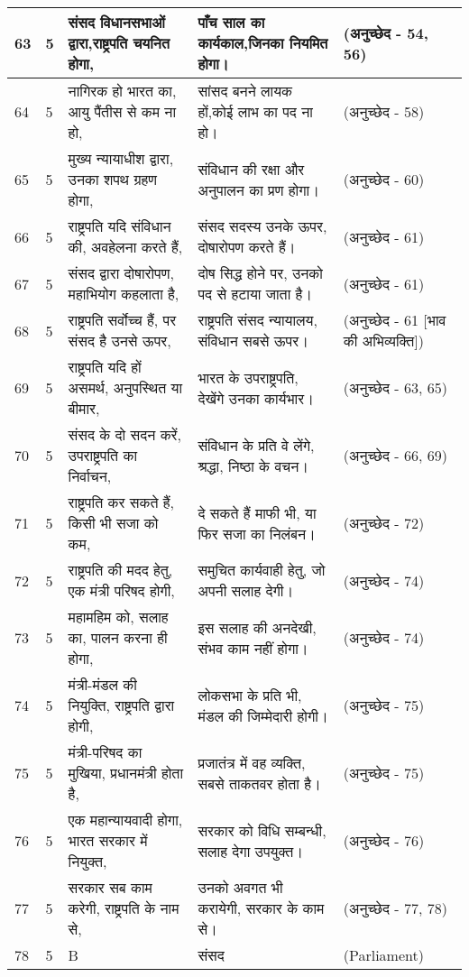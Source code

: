 \begin{longtable}{|l|l|l|l|l|}
63 & 5 & संसद विधानसभाओं द्वारा,राष्ट्रपति चयनित होगा, & पाँच साल का कार्यकाल,जिनका नियमित होगा। & (अनुच्छेद - 54, 56) \\ \hline 
64 & 5 & नागिरक हो भारत का, आयु पैंतीस से कम ना हो, & सांसद बनने लायक हों,कोई लाभ का पद ना हो। & (अनुच्छेद - 58) \\ \hline 
65 & 5 & मुख्य न्यायाधीश द्वारा, उनका शपथ ग्रहण होगा, & संविधान की रक्षा और अनुपालन का प्रण होगा। & (अनुच्छेद - 60) \\ \hline 
66 & 5 & राष्ट्रपति यदि संविधान की, अवहेलना करते हैं, & संसद सदस्य उनके ऊपर, दोषारोपण करते हैं। & (अनुच्छेद - 61) \\ \hline 
67 & 5 & संसद द्वारा दोषारोपण, महाभियोग कहलाता है, & दोष सिद्ध होने पर, उनको पद से हटाया जाता है। & (अनुच्छेद - 61) \\ \hline 
68 & 5 & राष्ट्रपति सर्वोच्च हैं, पर संसद है उनसे ऊपर, & राष्ट्रपति संसद न्यायालय, संविधान सबसे ऊपर। & (अनुच्छेद - 61 [भाव की अभिव्यक्ति]) \\ \hline 
69 & 5 & राष्ट्रपति यदि हों असमर्थ, अनुपस्थित या बीमार, & भारत के उपराष्ट्रपति, देखेंगे उनका कार्यभार। & (अनुच्छेद - 63, 65) \\ \hline 
70 & 5 & संसद के दो सदन करें, उपराष्ट्रपति का निर्वाचन, & संविधान के प्रति वे लेंगे, श्रद्धा, निष्ठा के वचन। & (अनुच्छेद - 66, 69) \\ \hline 
71 & 5 & राष्ट्रपति कर सकते हैं, किसी भी सजा को कम, & दे सकते हैं माफी भी, या फिर सजा का निलंबन। & (अनुच्छेद - 72) \\ \hline 
72 & 5 & राष्ट्रपति की मदद हेतु, एक मंत्री परिषद होगी, & समुचित कार्यवाही हेतु, जो अपनी सलाह देगी। & (अनुच्छेद - 74) \\ \hline 
73 & 5 & महामहिम को, सलाह का, पालन करना ही होगा, & इस सलाह की अनदेखी, संभव काम नहीं होगा। & (अनुच्छेद - 74) \\ \hline 
74 & 5 & मंत्री-मंडल की नियुक्ति, राष्ट्रपति द्वारा होगी, & लोकसभा के प्रति भी, मंडल की जिम्मेदारी होगी। & (अनुच्छेद - 75) \\ \hline 
75 & 5 & मंत्री-परिषद का मुखिया, प्रधानमंत्री होता है, & प्रजातंत्र में वह व्यक्ति, सबसे ताकतवर होता है। & (अनुच्छेद - 75) \\ \hline 
76 & 5 & एक महान्यायवादी होगा, भारत सरकार में नियुक्त, & सरकार को विधि सम्बन्धी, सलाह देगा उपयुक्त। & (अनुच्छेद - 76) \\ \hline 
77 & 5 & सरकार सब काम करेगी, राष्ट्रपति के नाम से, & उनको अवगत भी करायेगी, सरकार के काम से। & (अनुच्छेद - 77, 78) \\ \hline 
78 & 5 & B & संसद  & (Parliament) \\ \hline 

\end{longtable}
